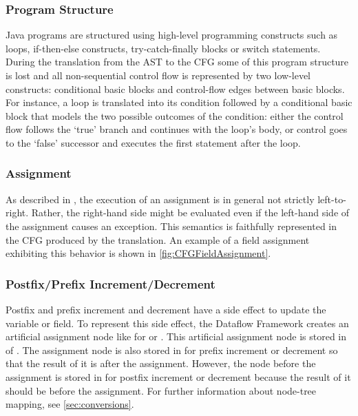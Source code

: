 \subsubsection{Program Structure}
\label{sec:prog-structure}

Java programs are structured using high-level programming constructs
such as loops, if-then-else constructs,
try-catch-finally blocks or switch statements.  During the translation
from the AST to the CFG some of this program structure is lost and all
non-sequential control flow is represented by two low-level
constructs: conditional basic blocks and control-flow edges between
basic blocks. For instance, a  loop is translated into its
condition followed by a conditional basic block that models the two
possible outcomes of the condition: either the control flow follows
the `true' branch and continues with the loop's body, or control goes to the
`false' successor and executes the first statement after the loop.


\subsubsection{Assignment}

As described in , the execution of an assignment is in
general not strictly left-to-right. Rather, the right-hand side might
be evaluated even if the left-hand side of the assignment causes an
exception. This semantics is faithfully represented in the CFG
produced by the translation.  An example of a field assignment
exhibiting this behavior is shown in \autoref{fig:CFGFieldAssignment}.


\subsubsection{Postfix/Prefix Increment/Decrement}
\label{sec:postpre-incdec}
Postfix and prefix increment and decrement have a side effect to
update the variable or field. To represent this side effect, the Dataflow
Framework creates an artificial assignment node like 
for  or . This artificial assignment node is stored
in  of . The assignment
node is also stored in  for prefix increment or decrement
so that the result of it is after the assignment. However, the node before
the assignment is stored in  for postfix increment or decrement
because the result of it should be before the assignment. For further information
about node-tree mapping, see \autoref{sec:conversions}.

